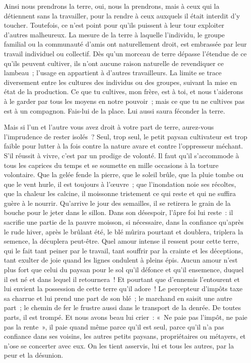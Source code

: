 \documentclass[french,twoside]{book} %
\begin{document}
\noindent Ainsi nous prendrons la terre, oui, nous la prendrons, mais à ceux qui la détiennent sans la travailler, pour la rendre à ceux auxquels il était interdit d’y toucher. Toutefois, ce n’est point pour qu’ils puissent à leur tour exploiter d’autres malheureux. La mesure de la terre à laquelle l’individu, le groupe familial ou la communauté d’amis ont naturellement droit, est embrassée par leur travail individuel ou collectif. Dès qu’un morceau de terre dépasse l’étendue de ce qu’ils peuvent cultiver, ils n’ont aucune raison naturelle de revendiquer ce lambeau ; l’usage en appartient à d’autres travailleurs. La limite se trace diversement entre les cultures des individus ou des groupes, suivant la mise en état de la production. Ce que tu cultives, mon frère, est à toi, et nous t’aiderons  à le garder par tous les moyens en notre pouvoir ; mais ce que tu ne cultives pas est à un compagnon. Fais-lui de la place. Lui aussi saura féconder la terre.\par
Mais si l’un et l’autre vous avez droit à votre part de terre, aurez-vous l’imprudence de rester isolés ? Seul, trop seul, le petit paysan cultivateur est trop faible pour lutter à la fois contre la nature avare et contre l’oppresseur méchant. S’il réussit à vivre, c’est par un prodige de volonté. Il faut qu’il s’accommode à tous les caprices du temps et se soumette en mille occasions à la torture volontaire. Que la gelée fende la pierre, que le soleil brûle, que la pluie tombe ou que le vent hurle, il est toujours à l’œuvre ; que l’inondation noie ses récoltes, que la chaleur les calcine, il moissonne tristement ce qui reste et qui ne suffira guère à le nourrir. Qu’arrive le jour des semailles, il se retirera le grain de la bouche pour le jeter dans le sillon. Dans son désespoir, l’âpre foi lui reste : il sacrifie une partie de la pauvre moisson, si nécessaire, dans la confiance qu’après le rude hiver, après le brûlant été, le blé mûrira pourtant et doublera, triplera la semence, la décuplera peut-être. Quel amour intense il ressent pour cette terre, qui le fait tant peiner par le travail, tant souffrir par la crainte et les déceptions,  tant exulter de joie quand les lignes ondulent à pleins épis. Aucun amour n’est plus fort que celui du paysan pour le sol qu’il défonce et qu’il ensemence, duquel il est né et dans lequel il retournera ! Et pourtant que d’ennemis l’entourent et lui envient la possession de cette terre qu’il adore ! Le percepteur d’impôts taxe sa charrue et lui prend une part de son blé ; le marchand en saisit une autre part ; le chemin de fer le frustre aussi dans le transport de la denrée. De toutes parts, il est trompé. Et nous avons beau lui crier : « Ne paie pas l’impôt, ne paie pas la rente », il paie quand même parce qu’il est seul, parce qu’il n’a pas confiance dans ses voisins, les autres petits paysans, propriétaires ou métayers, et n’ose se concerter avec eux. On les tient asservis, lui et tous les autres, par la peur et la désunion.\par
\end{document}

